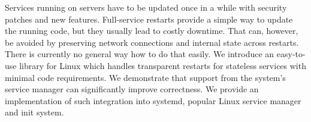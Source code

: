 \documentclass[12pt]{report}
\begin{document}

Services running on servers have to be updated once in a while with security patches and new features. Full-service restarts provide a simple way to update the running code, but they usually lead to costly downtime. That can, however, be avoided by preserving network connections and internal state across restarts. There is currently no general way how to do that easily. We introduce an easy-to-use library for Linux which handles transparent restarts for stateless services with minimal code requirements. We demonstrate that support from the system's service manager can significantly improve correctness. We provide an implementation of such integration into systemd, popular Linux service manager and init system.
\end{document}

